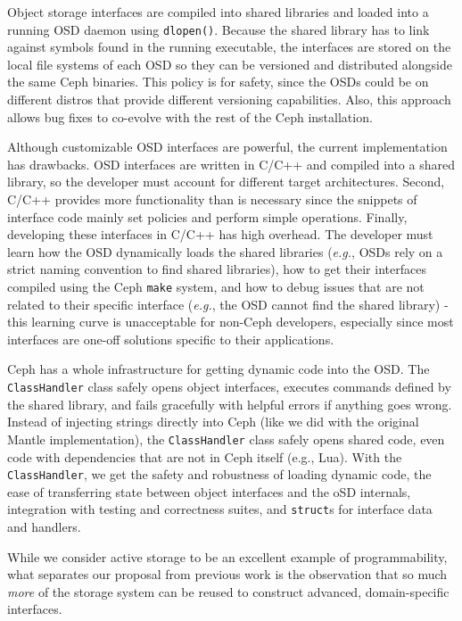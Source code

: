 \documentclass[10pt,twocolumn]{article}
\begin{document}
Object storage interfaces are compiled into shared libraries and loaded
into a running OSD daemon using \texttt{dlopen()}. Because the shared
library has to link against symbols found in the running executable, the
interfaces are stored on the local file systems of each OSD so they can
be versioned and distributed alongside the same Ceph binaries. This
policy is for safety, since the OSDs could be on different distros that
provide different versioning capabilities. Also, this approach allows
bug fixes to co-evolve with the rest of the Ceph installation.

Although customizable OSD interfaces are powerful, the current
implementation has drawbacks. OSD interfaces are written in C/C++ and
compiled into a shared library, so the developer must account for
different target architectures. Second, C/C++ provides more
functionality than is necessary since the snippets of interface code
mainly set policies and perform simple operations. Finally, developing
these interfaces in C/C++ has high overhead. The developer must learn
how the OSD dynamically loads the shared libraries (\emph{e.g.}, OSDs
rely on a strict naming convention to find shared libraries), how to get
their interfaces compiled using the Ceph \texttt{make} system, and how
to debug issues that are not related to their specific interface
(\emph{e.g.}, the OSD cannot find the shared library) - this learning
curve is unacceptable for non-Ceph developers, especially since most
interfaces are one-off solutions specific to their applications.

Ceph has a whole infrastructure for getting dynamic code into the OSD.
The \texttt{ClassHandler} class safely opens object interfaces, executes
commands defined by the shared library, and fails gracefully with
helpful errors if anything goes wrong. Instead of injecting strings
directly into Ceph (like we did with the original Mantle
implementation), the \texttt{ClassHandler} class safely opens shared
code, even code with dependencies that are not in Ceph itself (e.g.,
Lua). With the \texttt{ClassHandler}, we get the safety and robustness
of loading dynamic code, the ease of transferring state between object
interfaces and the oSD internals, integration with testing and
correctness suites, and \texttt{struct}s for interface data and
handlers.

While we consider active storage to be an excellent example of
programmability, what separates our proposal from previous work is the
observation that so much \emph{more} of the storage system can be reused
to construct advanced, domain-specific interfaces.
\end{document}
